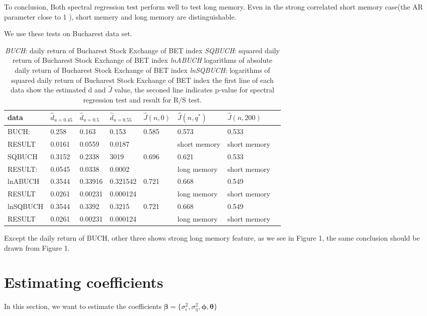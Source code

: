 \documentclass[10pt,a4paper]{article}
\begin{document}
To conclusion, Both spectral regression test perform well to test long memory. Even in the strong correlated short memory case(the AR parameter close to 1 ), short memery and long memory are distinguishable.

We use these tests on Bucharest data set. 

\begin{table}[!hbp]
\begin{tabular}{llllllll}
\hline
\hline
data & $\hat{d}_{u=0.45}$ & $\hat{d}_{u=0.5}$ & $\hat{d}_{u=0.55}$ & $\hat{J}(n,0) $& $\hat{J}(n,q^*) $&$\hat{J}(n,200)$ \\
\hline
BUCH: & 0.258 & 0.163 &  0.153 & 0.585 &     0.573 & 0.533 \\
RESULT& 0.0161 & 0.0559  & 0.0187 & \, &   short memory &  short memory\\
\hline
SQBUCH  & 0.3152 & 0.2338   & 3019 & 0.696  &   0.621 & 0.533\\
RESULT: & 0.0545 &0.0338  & 0.0002  & \, &   long memory & short memory \\
\hline
lnABUCH& 0.3544 & 0.33916  & 0.321542 & 0.721 &   0.668 & 0.549\\
RESULT & 0.0261 &  0.00231  & 0.000124 & \,  &  long memory & short memory\\
\hline
lnSQBUCH &0.3544 & 0.3392 &  0.3215 & 0.721 &     0.668 & 0.549 \\
RESULT& 0.0261  & 0.00231  & 0.000124  & \,  &   long memory &  short memory\\
\hline
\end{tabular}
\caption{\emph{BUCH}: daily return of Bucharest Stock Exchange of BET index\qquad
\emph{SQBUCH}: squared daily return of Bucharest Stock Exchange of BET index \qquad \emph{lnABUCH} logarithms of absolute daily return of Bucharest Stock Exchange of BET index \qquad \emph{lnSQBUCH}: logarithms of squared daily return of Bucharest Stock Exchange of BET index \qquad\qquad the first line of each data show the estimated d and $\hat{J}$ value, the seconed line indicates p-value for spectral regression test and result for R/S test.
}

\end{table}
Except the daily return of BUCH, other three shows strong long memory feature, as we see in Figure 1, the same conclusion should be drawn from Figure 1.
 
\section{Estimating coefficients}
In this section, we want to estimate the coefficients $\bm{\beta}=\{\sigma_\epsilon^2,\sigma_\eta^2,\bm{\phi,\bm{\theta}}\}$
\end{document}
